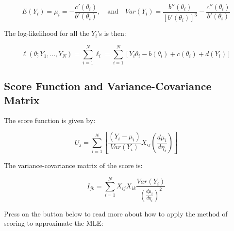 \documentclass[11pt]{article}
\begin{document}
\[ E(Y_i) = \mu_i = -\frac{c'(\theta_i)}{b'(\theta_i)}, \quad \text{and} \quad Var(Y_i) = \frac{b''(\theta_i)}{[b'(\theta_i)]^3} - \frac{c''(\theta_i)}{b'(\theta_i)} \]

The log-likelihood for all the $Y_i$'s is then:

\[ \ell(\theta; Y_1, \dots, Y_N) = \sum_{i=1}^{N} \ell_i = \sum_{i=1}^{N} \left[ Y_i \theta_i - b(\theta_i) + c(\theta_i) + d(Y_i) \right] \]

\subsection{Score Function and Variance-Covariance Matrix}

The score function is given by:

\[ U_j = \sum_{i=1}^{N} \left[ \frac{(Y_i - \mu_i)}{Var(Y_i)} X_{ij} \left( \frac{d\mu_i}{d\eta_i} \right) \right] \]

The variance-covariance matrix of the score is:

\[ I_{jk} = \sum_{i=1}^{N} X_{ij} X_{ik} \frac{Var(Y_i)}{\left( \frac{d\mu_i}{d\eta_i} \right)^2} \]

Press on the button below to read more about how to apply the method of scoring to approximate the MLE:
\end{document}

